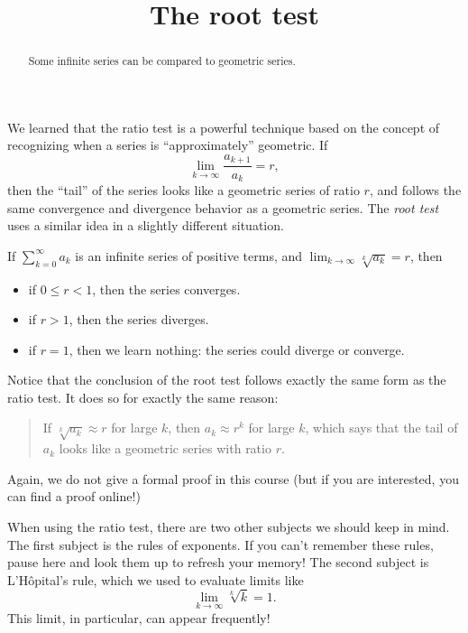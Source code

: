 \documentclass{ximera}
\title[Dig-In:]{The root test}
\begin{document}
\begin{abstract}
Some infinite series can be compared to geometric series.
\end{abstract}
\maketitle

We learned that the ratio test is a powerful technique based on the
concept of recognizing when a series is ``approximately'' geometric.
If
\[
\lim_{k \to \infty} \frac{a_{k+1}}{a_k} = r,
\]
then the ``tail'' of the series looks like a geometric series of ratio
$r$, and follows the same convergence and divergence behavior as a
geometric series.  The \textit{root test} uses a similar idea in a
slightly different situation.
\begin{theorem}
  If $\sum_{k=0}^\infty a_k$ is an infinite series of positive terms, and $\lim_{k \to \infty} \sqrt[k]{a_k} = r$, then 
  \begin{itemize}
  \item if $0 \leq r < 1$, then the series converges.
  \item if $r>1$, then the series diverges.
  \item if $r = 1$, then we learn nothing:  the series could diverge or converge.
  \end{itemize}
\end{theorem}
Notice that the conclusion of the root test follows exactly the same
form as the ratio test.  It does so for exactly the same reason:
\begin{quote}
  If $\sqrt[k]{a_k} \approx r$ for large $k$, then $a_k \approx r^k$
  for large $k$, which says that the tail of $a_k$ looks like
  a geometric series with ratio $r$.
\end{quote}
Again, we do not give a formal proof in this course (but if you are
interested, you can find a proof online!)

When using the ratio test, there are two other subjects we should keep in mind. 
The first subject is the rules of exponents.  If you can't remember these rules, 
pause here and look them up to refresh your memory!  The second subject is 
L'H\^{o}pital's rule, which we used to evaluate limits like
\[
\lim_{k \to \infty} \sqrt[k]{k} = 1.
\]
This limit, in particular, can appear frequently!
\end{document}
